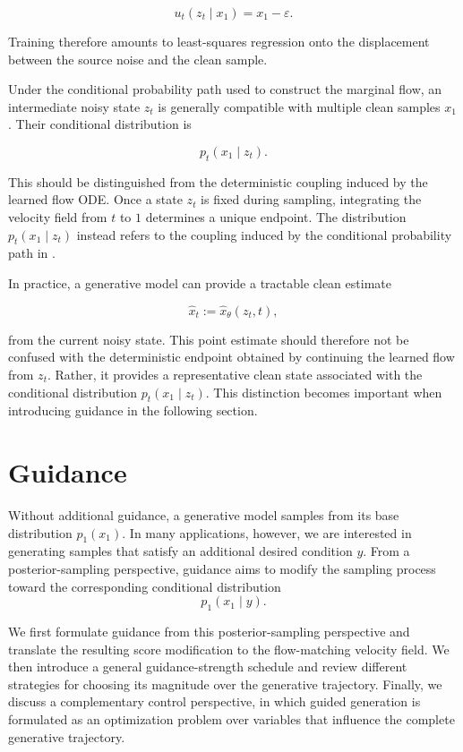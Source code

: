 \begin{equation}
    u_t(z_t\mid x_1)
    =
    x_1-\varepsilon.
    \label{eq:linear-conditional-velocity}
\end{equation}

Training therefore amounts to least-squares regression onto the displacement
between the source noise and the clean sample.

Under the conditional probability path used to construct the marginal flow, an
intermediate noisy state $z_t$ is generally compatible with multiple clean
samples $x_1$. Their conditional distribution is

\[
    p_t(x_1\mid z_t).
\]

This should be distinguished from the deterministic coupling induced by the
learned flow ODE. Once a state $z_t$ is fixed during sampling, integrating the
velocity field from $t$ to $1$ determines a unique endpoint. The distribution
$p_t(x_1\mid z_t)$ instead refers to the coupling induced by the conditional
probability path in .

In practice, a generative model can provide a tractable clean estimate

\begin{equation}
    \hat{x}_t
    :=
    \hat{x}_\theta(z_t,t),
    \label{eq:clean-estimate}
\end{equation}

from the current noisy state. This point estimate should therefore not be
confused with the deterministic endpoint obtained by continuing the learned
flow from $z_t$. Rather, it provides a representative clean state associated
with the conditional distribution $p_t(x_1\mid z_t)$. This distinction becomes
important when introducing guidance in the following section.

\section{Guidance}

Without additional guidance, a generative model samples from its base
distribution $p_1(x_1)$.
In many applications, however, we are interested in generating samples that
satisfy an additional desired condition \(y\).
From a posterior-sampling perspective, guidance aims to modify the sampling
process toward the corresponding conditional distribution
\[
    p_1(x_1\mid y).
\]

We first formulate guidance from this posterior-sampling perspective and
translate the resulting score modification to the flow-matching velocity
field.
We then introduce a general guidance-strength schedule and review different
strategies for choosing its magnitude over the generative trajectory.
Finally, we discuss a complementary control perspective, in which guided
generation is formulated as an optimization problem over variables that
influence the complete generative trajectory.


